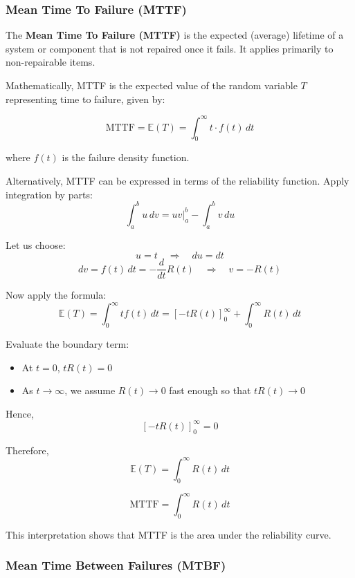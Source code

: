 \documentclass[twoside]{book}
\begin{document}
\subsubsection{Mean Time To Failure (MTTF)}

\begin{textbox}
The \textbf{Mean Time To Failure (MTTF)} is the expected (average) lifetime of a system or component that is not repaired once it fails. It applies primarily to non-repairable items.
\end{textbox}

Mathematically, MTTF is the expected value of the random variable $T$ representing time to failure, given by:

\begin{textbox}
\[
\text{MTTF} = \mathbb{E}(T) = \int_0^{\infty} t \cdot f(t) \, dt
\]
\end{textbox}

where $f(t)$ is the failure density function.

Alternatively, MTTF can be expressed in terms of the reliability function. Apply integration by parts:
\[
\int_a^b u\, dv = uv \big|_a^b - \int_a^b v\, du
\]

Let us choose:
\[
u = t \quad \Rightarrow \quad du = dt
\]
\[
dv = f(t)\,dt  = -\dfrac{d}{dt} R(t)\quad \Rightarrow \quad v = -R(t)
\]

Now apply the formula:
\[
\mathbb{E}(T) = \int_0^\infty t f(t)\, dt = \left[ -t R(t) \right]_0^\infty + \int_0^\infty R(t)\, dt
\]

Evaluate the boundary term:
\begin{itemize}
    \item At \( t = 0 \), \( t R(t) = 0 \)
    \item As \( t \to \infty \), we assume \( R(t) \to 0 \) fast enough so that \( t R(t) \to 0 \)
\end{itemize}
Hence,
\[
\left[ -t R(t) \right]_0^\infty = 0
\]

Therefore,
$$\mathbb{E}(T) = \int_0^\infty R(t)\, dt$$

\begin{textbox}
\[
\text{MTTF} = \int_0^\infty R(t)\, dt
\]
\end{textbox}

This interpretation shows that MTTF is the area under the reliability curve.

\subsubsection{Mean Time Between Failures (MTBF)}
\end{document}
